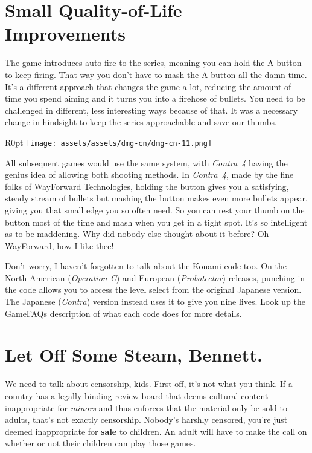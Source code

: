 \documentclass{book}
\begin{document}
\FloatBarrier\needspace{10mm}\section*{Small Quality-of-Life Improvements}\nopagebreak[4]

The game introduces auto-fire to the series, meaning you can hold the A button to keep firing. That way you don’t have to mash the A button all the damn time. It’s a different approach that changes the game a lot, reducing the amount of time you spend aiming and it turns you into a firehose of bullets. You need to be challenged in different, less interesting ways because of that. It was a necessary change in hindsight to keep the series approachable and save our thumbs.

\begin{wrapfigure}{R}{0pt} \texttt{[image: assets/assets/dmg-cn/dmg-cn-11.png]}\end{wrapfigure}
All subsequent games would use the same system, with \emph{Contra~4} having the genius idea of allowing both shooting methods. In \emph{Contra~4}, made by the fine folks of WayForward Technologies, holding the button gives you a satisfying, steady stream of bullets but mashing the button makes even more bullets appear, giving you that small edge you so often need. So you can rest your thumb on the button most of the time and mash when you get in a tight spot. It’s so intelligent as to be maddening. Why did nobody else thought about it before? Oh WayForward, how I like thee!

Don’t worry, I haven’t forgotten to talk about the Konami code too. On the North American (\emph{Operation C}) and European (\emph{Probotector}) releases, punching in the code allows you to access the level select from the original Japanese version. The Japanese (\emph{Contra}) version instead uses it to give you nine lives. Look up the GameFAQs description of what each code does for more details.

\FloatBarrier\needspace{10mm}\section*{Let Off Some Steam, Bennett.}\nopagebreak[4]

We need to talk about censorship, kids. First off, it’s not what you think. If a country has a legally binding review board that deems cultural content inappropriate for \emph{minors} and thus enforces that the material only be sold to adults, that’s not exactly censorship. Nobody’s harshly censored, you’re just deemed inappropriate for \textbf{sale} to children. An adult will have to make the call on whether or not their children can play those games.
\end{document}
